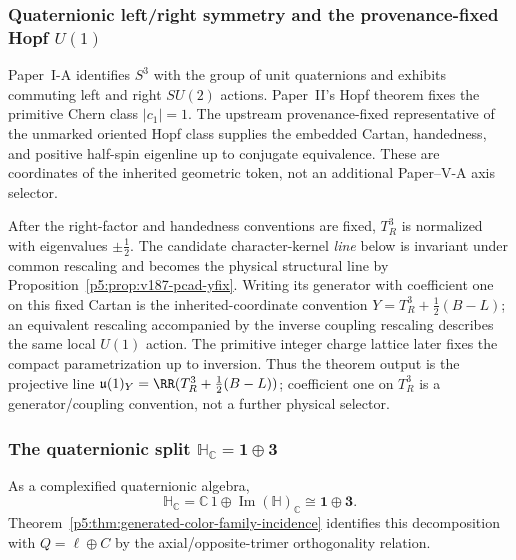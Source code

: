 \documentclass[12pt,a4paper]{article}
\begin{document}
\subsubsection{Quaternionic left/right symmetry and the provenance-fixed Hopf \texorpdfstring{\(U(1)\)}{U(1)}}
\label{p5:sec:part1-native-hopf}

Paper~I-A \cite{Kugelmann2026a} identifies \(S^3\) with the group of unit
quaternions and exhibits commuting left and right \(SU(2)\) actions.
Paper~II's Hopf theorem fixes the primitive Chern class \(|c_1|=1\).  The upstream provenance-fixed representative of the unmarked oriented Hopf
class supplies the embedded Cartan, handedness, and positive half-spin eigenline
up to conjugate equivalence.  These are coordinates of the inherited
geometric token, not an additional Paper--V-A axis selector.

\begin{remark}
\label{p5:rem:forced-hopf-half-unit-import}
After the right-factor and handedness conventions are fixed, \(T_R^3\) is
normalized with eigenvalues \(\pm\frac12\).  The candidate character-kernel
\emph{line} below is invariant under common rescaling and becomes the physical
structural line by Proposition~\ref{p5:prop:v187-pcad-yfix}.  Writing its generator with coefficient one on
this fixed Cartan is the inherited-coordinate convention
\(Y=T_R^3+\frac12(B-L)\); an equivalent rescaling accompanied by the inverse
coupling rescaling describes the same local \(U(1)\) action.  The primitive
integer charge lattice later fixes the compact parametrization up to
inversion.  Thus the theorem output is the projective line
\(\mathfrak u(1)_Y=\RR(T_R^3+\tfrac12(B-L))\); coefficient one on
\(T_R^3\) is a generator/coupling convention, not a further physical selector.
\end{remark}

\subsubsection{The quaternionic split \texorpdfstring{$\mathbb H_{\mathbb C}=\mathbf 1\oplus \mathbf 3$}{HC=1+3}}
\label{p5:sec:part1-native-qsplit}

As a complexified quaternionic algebra,
\begin{equation}
\label{p5:eq:part1-HC-split}
\mathbb H_{\mathbb C}
=
\mathbb C\,1 \oplus \operatorname{Im}(\mathbb H)_{\mathbb C}
\cong \mathbf 1\oplus \mathbf 3.
\end{equation}
Theorem~\ref{p5:thm:generated-color-family-incidence} identifies this
decomposition with \(Q=\ell\oplus C\) by the axial/opposite-trimer
orthogonality relation.
\end{document}
